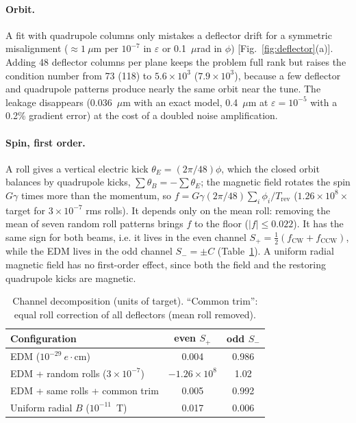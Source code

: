 \documentclass[aps,prab,reprint,superscriptaddress,nofootinbib]{revtex4-2}
\begin{document}
\paragraph*{Orbit.} A fit with quadrupole columns only mistakes a deflector drift for a symmetric misalignment
($\approx1~\mu$m per $10^{-7}$ in $\varepsilon$ or 0.1~$\mu$rad in $\phi$) [Fig.~\ref{fig:deflector}(a)]. Adding 48
deflector columns per plane keeps the problem full rank but raises the condition number from 73 (118) to
$5.6\times10^3$ ($7.9\times10^3$), because a few deflector and quadrupole patterns produce nearly the same orbit
near the tune. The leakage disappears (0.036~$\mu$m with an exact model, 0.4~$\mu$m at $\varepsilon=10^{-5}$ with
a 0.2\% gradient error) at the cost of a doubled noise amplification.

\paragraph*{Spin, first order.} A roll gives a vertical electric kick $\theta_E=(2\pi/48)\phi$, which the closed
orbit balances by quadrupole kicks, $\sum\theta_B=-\sum\theta_E$; the magnetic field rotates the spin $G\gamma$
times more than the momentum, so $f=G\gamma(2\pi/48)\sum_i\phi_i/T_\text{rev}$ ($1.26\times10^8\times$ target for
$3\times10^{-7}$ rms rolls). It depends only on the mean roll: removing the mean of seven random roll patterns
brings $f$ to the floor ($|f|\le0.022$). It has the same sign for both beams, i.e. it lives in the even channel
$S_+=\tfrac12(f_\text{CW}+f_\text{CCW})$, while the EDM lives in the odd channel $S_-=\pm C$
(Table~\ref{tbl:channels}). A uniform radial magnetic field has no first-order effect, since both the field
and the restoring quadrupole kicks are magnetic.

\begin{table}[tb]
\centering
\caption{Channel decomposition (units of target). ``Common trim'': equal roll correction of all deflectors
(mean roll removed).}
\begin{tabular}{lcc}
\hline
Configuration & even $S_+$ & odd $S_-$ \\
\hline
EDM ($10^{-29}~e\cdot$cm) & 0.004 & 0.986 \\
EDM + random rolls ($3\times10^{-7}$) & $-1.26\times10^{8}$ & 1.02 \\
EDM + same rolls + common trim & 0.005 & 0.992 \\
Uniform radial $B$ ($10^{-11}$~T) & 0.017 & 0.006 \\
\hline
\end{tabular}
\label{tbl:channels}
\end{table}
\end{document}

